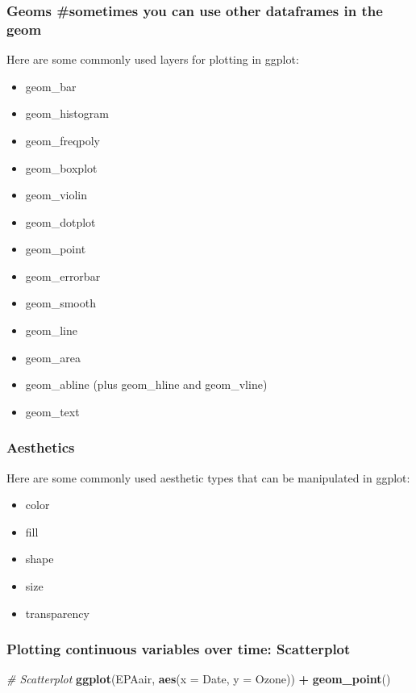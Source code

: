 \documentclass[]{article}
\newenvironment{Shaded}{\begin{snugshade}}{\end{snugshade}}
\newcommand{\KeywordTok}[1]{\textcolor[rgb]{0.13,0.29,0.53}{\textbf{#1}}}
\newcommand{\DataTypeTok}[1]{\textcolor[rgb]{0.13,0.29,0.53}{#1}}
\newcommand{\StringTok}[1]{\textcolor[rgb]{0.31,0.60,0.02}{#1}}
\newcommand{\CommentTok}[1]{\textcolor[rgb]{0.56,0.35,0.01}{\textit{#1}}}
\newcommand{\OperatorTok}[1]{\textcolor[rgb]{0.81,0.36,0.00}{\textbf{#1}}}
\newcommand{\NormalTok}[1]{#1}
\providecommand{\tightlist}{%
  \setlength{\itemsep}{0pt}\setlength{\parskip}{0pt}}
\begin{document}
\subsubsection{Geoms \#sometimes you can use other dataframes in the
geom}\label{geoms-sometimes-you-can-use-other-dataframes-in-the-geom}

Here are some commonly used layers for plotting in ggplot:

\begin{itemize}
\tightlist
\item
  geom\_bar
\item
  geom\_histogram
\item
  geom\_freqpoly
\item
  geom\_boxplot
\item
  geom\_violin
\item
  geom\_dotplot
\item
  geom\_point
\item
  geom\_errorbar
\item
  geom\_smooth
\item
  geom\_line
\item
  geom\_area
\item
  geom\_abline (plus geom\_hline and geom\_vline)
\item
  geom\_text
\end{itemize}

\subsubsection{Aesthetics}\label{aesthetics}

Here are some commonly used aesthetic types that can be manipulated in
ggplot:

\begin{itemize}
\tightlist
\item
  color
\item
  fill
\item
  shape
\item
  size
\item
  transparency
\end{itemize}

\subsubsection{Plotting continuous variables over time:
Scatterplot}\label{plotting-continuous-variables-over-time-scatterplot}

\begin{Shaded}
\begin{Highlighting}[]
\CommentTok{# Scatterplot}
\KeywordTok{ggplot}\NormalTok{(EPAair, }\KeywordTok{aes}\NormalTok{(}\DataTypeTok{x =}\NormalTok{ Date, }\DataTypeTok{y =}\NormalTok{ Ozone)) }\OperatorTok{+}\StringTok{ }
\StringTok{  }\KeywordTok{geom_point}\NormalTok{()}
\end{Highlighting}
\end{Shaded}
\end{document}
